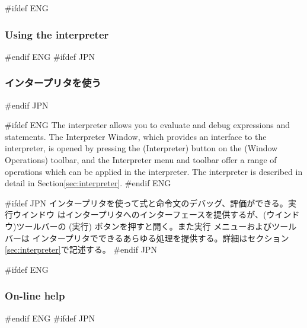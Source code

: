 \documentclass[\pformat,12pt]{article}
\newcommand{\guicmd}[1]{{\sf #1}}
\newcommand{\guicmd}[1]{{\gt #1}}
\begin{document}


#ifdef ENG
\subsubsection{Using the interpreter}
#endif ENG
#ifdef JPN
\subsubsection{インタープリタを使う}
#endif JPN

#ifdef ENG
The interpreter allows you to evaluate and debug expressions and
statements. The \guicmd{Interpreter Window}, which provides an
interface to the interpreter, is opened by pressing the 
(\guicmd{Interpreter}) button on the (\guicmd{Window Operations})
toolbar, and the \guicmd{Interpreter} menu and toolbar offer a range
of operations which can be applied in the interpreter. The interpreter
is described in detail in Section\ref{sec:interpreter}.
#endif ENG

#ifdef JPN
インタープリタを使って式と命令文のデバッグ、評価ができる。\guicmd{実行ウインドウ}
はインタープリタへのインターフェースを提供するが、(\guicmd{ウインドウ})ツールバーの 
(\guicmd{実行}) ボタンを押すと開く。また\guicmd{実行} メニューおよびツールバーは
インタープリタでできるあらゆる処理を提供する。詳細はセクション\ref{sec:interpreter}で記述する。
#endif JPN

#ifdef ENG
\subsubsection{On-line help}
#endif ENG
#ifdef JPN
\end{document}
